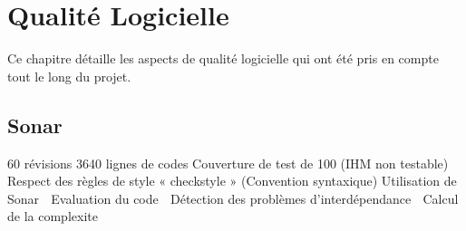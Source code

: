 \chapter{Qualité Logicielle}

Ce chapitre détaille les aspects de qualité logicielle qui ont été pris en compte tout le long du projet.

\section{Sonar}

60 révisions 
3640 lignes de codes 
Couverture de test de 100%
(IHM non testable) 
Respect des règles de style « checkstyle » (Convention syntaxique)
Utilisation de Sonar
 Evaluation du code 
 Détection des problèmes d’interdépendance 
 Calcul de la complexite